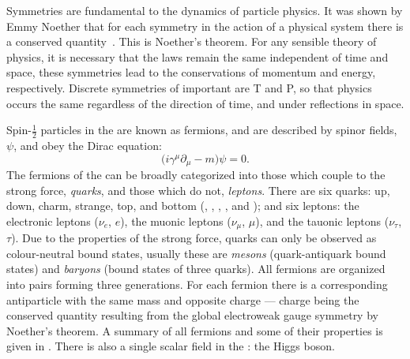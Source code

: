 Symmetries are fundamental to the dynamics of particle physics.
It was shown by Emmy Noether that for each symmetry in the action of a physical system there is a
conserved quantity~\cite{Noether}.
This is Noether's theorem.
For any sensible theory of physics, it is necessary that the laws remain the same independent of
time and space, these symmetries lead to the conservations of momentum and energy, respectively.
Discrete symmetries of important are \gls{T} and \gls{P}, so that physics occurs the same
regardless of the direction of time, and under reflections in space.


Spin-$\tfrac12$ particles in the \sm are known as fermions, and
are described by spinor fields, $\psi$, and obey the Dirac equation:
\begin{equation}
  \big(i\gamma^\mu\partial_\mu - m\big)\psi = 0.
  \label{th:eq:dirac}
\end{equation}
The fermions of the \sm can be broadly categorized into those which couple to the strong force,
\emph{quarks}, and those which do not, \emph{leptons}.
There are six quarks: up, down, charm, strange, top, and bottom (\uquark, \dquark, \cquark,
\squark, \tquark and \bquark); and six leptons:
the electronic leptons ($\nu_e$, $e$),
the muonic leptons ($\nu_\mu$, $\mu$),
and the tauonic leptons ($\nu_\tau$, $\tau$).
Due to the properties of the strong force, quarks can only be observed as colour-neutral bound
states, usually these are
\emph{mesons} (quark-antiquark bound states) and \emph{baryons} (bound states of three quarks).
All fermions are organized into pairs forming three generations.
For each fermion there is a corresponding antiparticle with the same mass and opposite charge ---
charge being the conserved quantity resulting from the global electroweak gauge symmetry by
Noether's theorem.
A summary of all fermions and some of their properties is given in .
There is also a single scalar field in the \sm: the Higgs boson.

